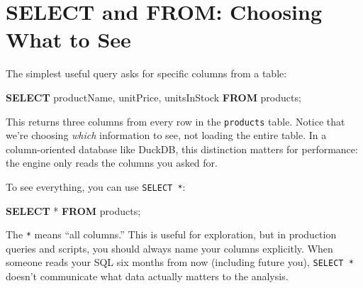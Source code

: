 \documentclass[
  letterpaper,
  DIV=11,
  numbers=noendperiod]{scrreprt}
\newenvironment{Shaded}{\begin{snugshade}}{\end{snugshade}}
\newcommand{\KeywordTok}[1]{\textcolor[rgb]{0.00,0.23,0.31}{\textbf{#1}}}
\newcommand{\NormalTok}[1]{\textcolor[rgb]{0.00,0.23,0.31}{#1}}
\newcommand{\OperatorTok}[1]{\textcolor[rgb]{0.37,0.37,0.37}{#1}}
\begin{document}
\section{SELECT and FROM: Choosing What to
See}\label{select-and-from-choosing-what-to-see}

The simplest useful query asks for specific columns from a table:

\begin{codelisting}

\caption{\texttt{duckdb}}

\begin{Shaded}
\begin{Highlighting}[]
\KeywordTok{SELECT}
\NormalTok{    productName,}
\NormalTok{    unitPrice,}
\NormalTok{    unitsInStock}
\KeywordTok{FROM}\NormalTok{ products;}
\end{Highlighting}
\end{Shaded}

\end{codelisting}

This returns three columns from every row in the \texttt{products}
table. Notice that we're choosing \emph{which} information to see, not
loading the entire table. In a column-oriented database like DuckDB,
this distinction matters for performance: the engine only reads the
columns you asked for.

To see everything, you can use \texttt{SELECT\ *}:

\begin{codelisting}

\caption{\texttt{duckdb}}

\begin{Shaded}
\begin{Highlighting}[]
\KeywordTok{SELECT} \OperatorTok{*} \KeywordTok{FROM}\NormalTok{ products;}
\end{Highlighting}
\end{Shaded}

\end{codelisting}

The \texttt{*} means ``all columns.'' This is useful for exploration,
but in production queries and scripts, you should always name your
columns explicitly. When someone reads your SQL six months from now
(including future you), \texttt{SELECT\ *} doesn't communicate what data
actually matters to the analysis.
\end{document}
